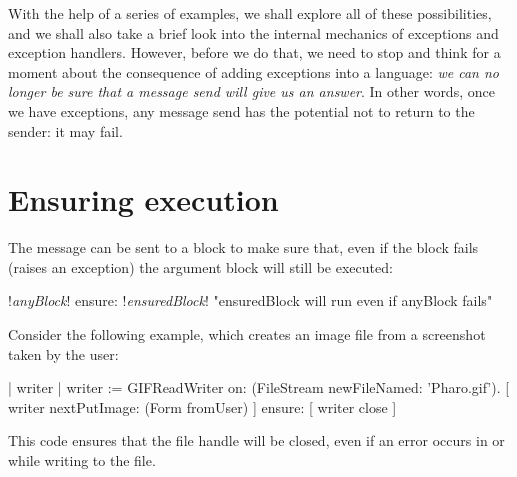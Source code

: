 \documentclass[a4paper,10pt,twoside]{book}
\begin{document}
With the help of a series of examples, we shall explore all of these possibilities, and we shall also take a brief look into the internal mechanics of exceptions and exception handlers.
However, before we do that, we need to stop and think for a moment about the consequence of adding exceptions into a language: \emph{we can no longer be sure that a message send will give us an answer}.  
In other words, once we have exceptions, any message send has the potential not to return to the sender: it may fail.

\section{Ensuring execution}

The  message can be sent to a block to make sure that, even if the block fails (\eg raises an exception) the argument block will still be executed:
\begin{code}{}
!\emph{anyBlock}! ensure: !\emph{ensuredBlock}!    "ensuredBlock will run even if anyBlock fails"
\end{code}

Consider the following example, which creates an image file from a screenshot taken by the user:



\begin{code}{}
| writer |
writer := GIFReadWriter on: (FileStream newFileNamed: 'Pharo.gif').
[ writer nextPutImage: (Form fromUser) ]
	ensure: [ writer close ]
\end{code}


\noindent
This code ensures that the  file handle will be closed, even if an error occurs in  or while writing to the file.
\end{document}
